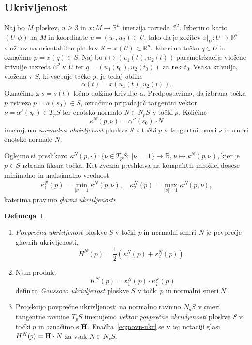 \documentclass[12pt,a4paper,twoside]{article}
\theoremstyle{definition} %
\newtheorem{definicija}{Definicija}[section]
\theoremstyle{plain} %
\numberwithin{equation}{section}  %
\newcommand{\R}{\mathbb R}
\begin{document}
\subsection{Ukrivljenost}
%
Naj bo $M$ ploskev, $n \geq 3$ in $x \colon M \to \R^{n}$ imerzija razreda $\mathcal{C}^2$. Izberimo karto $(U, \phi)$ na $M$ in koordinate $u = (u_1, u_2) \in U$, tako da je zožitev $x|_{U} \colon U \to \R^{n}$ vložitev na orientabilno ploskev $S = x(U) \subset \R^{n}$. Izberimo točko $q \in U$ in označimo $p = x(q) \in S$. Naj bo $t \mapsto (u_1(t), u_2(t))$ parametrizacija vložene krivulje razreda $\mathcal{C}^2$ v $U$ ter $q = (u_1(t_0), u_2(t_0))$ za nek $t_0$. Vsaka krivulja, vložena v $S$, ki vsebuje točko $p$, je tedaj oblike
\begin{equation}
\alpha (t) = x(u_1(t), u_2(t)).
\end{equation}
Označimo z $s = s(t)$ ločno dolžino krivulje $\alpha$. Predpostavimo, da izbrana točka $p$ ustreza $p = \alpha(s_0) \in S$, označimo pripadajoč tangentni vektor $\nu = \alpha '(s_0) \in T_{p}S$ ter enotsko normalo $N \in N_{p}S$ v točki $p$. Količino
\begin{equation}
\kappa ^{N}(p, \nu) = \alpha ''(s_0) \cdot N
\end{equation}
imenujemo \emph{normalna ukrivljenost} ploskve $S$ v točki $p$ v tangentni smeri $\nu$ in smeri enotske normale $N$.

Oglejmo si preslikavo $ \kappa ^{N}(p, \cdot) \colon \{\nu \in T_{p}S ; \ |\nu|=1 \} \to \R$, $ \nu \mapsto \kappa ^{N}(p, \nu)$, kjer je $p \in S$ izbrana fiksna točka. Kot zvezna preslikava na kompaktni množici doseže minimalno in maksimalno vrednost,
\begin{align}
\kappa _{1}^{N}(p) = \min _{|\nu| = 1} \kappa ^{N}(p, \nu), \quad \kappa _{2}^{N}(p) = \max _{|\nu| = 1} \kappa ^{N}(p, \nu),
\end{align}
katerima pravimo \emph{glavni ukrivljenosti}.

\begin{definicija}
\begin{enumerate}
\item
\emph{Povprečna ukrivljenost} ploskve $S$ v točki $p$ in normalni smeri $N$ je povprečje glavnih ukrivljenosti,
\begin{equation} \label{eq:povp-ukr}
H^{N}(p) = \frac{1}{2} \left(\kappa _{1}^{N}(p) + \kappa _{2}^{N}(p) \right).
\end{equation}
\item
Njun produkt 
\begin{equation} \label{eq:Gauss-ukr}
K^{N}(p) = \kappa _{1}^{N}(p) \cdot \kappa _{2}^{N}(p)
\end{equation}
definira \emph{Gaussovo ukrivljenost} ploskve $S$ v točki $p$ in normalni smeri $N$.
\item
Projekcijo povprečne ukrivljenosti na normalno ravnino $N_{p}S$ v smeri tangentne ravnine $T_{p}S$ imenujemo \emph{vektor povprečne ukrivljenosti} ploskve $S$ v točki $p$ in označimo s $\textbf{\textup{H}}$. Enačba~\ref{eq:povp-ukr} se v tej notaciji glasi $H^{N}(p) = \textbf{\textup{H}} \cdot N$ za vsak $N \in N_{p}S$.
\end{enumerate}
\end{definicija}
\end{document}
